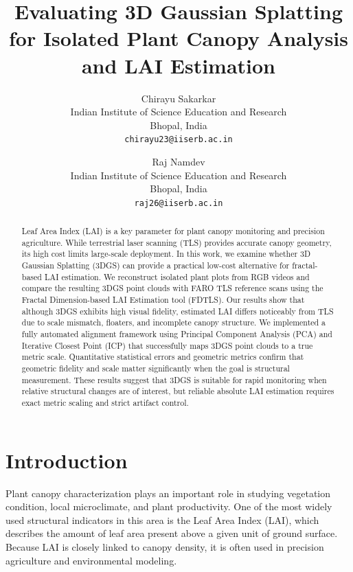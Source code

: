 \documentclass[10pt,twocolumn,letterpaper]{article}
\begin{document}
\title{Evaluating 3D Gaussian Splatting for Isolated Plant Canopy Analysis and LAI Estimation}

\author{Chirayu Sakarkar\\
Indian Institute of Science Education and Research\\
Bhopal, India\\
{\tt\small chirayu23@iiserb.ac.in}
\and
Raj Namdev\\
Indian Institute of Science Education and Research\\
Bhopal, India\\
{\tt\small raj26@iiserb.ac.in}
}

\maketitle

\begin{abstract}
Leaf Area Index (LAI) is a key parameter for plant canopy monitoring and precision agriculture. While terrestrial laser scanning (TLS) provides accurate canopy geometry, its high cost limits large-scale deployment. In this work, we examine whether 3D Gaussian Splatting (3DGS) can provide a practical low-cost alternative for fractal-based LAI estimation. We reconstruct isolated plant plots from RGB videos and compare the resulting 3DGS point clouds with FARO TLS reference scans using the Fractal Dimension-based LAI Estimation tool (FDTLS). Our results show that although 3DGS exhibits high visual fidelity, estimated LAI differs noticeably from TLS due to scale mismatch, floaters, and incomplete canopy structure. We implemented a fully automated alignment framework using Principal Component Analysis (PCA) and Iterative Closest Point (ICP) that successfully maps 3DGS point clouds to a true metric scale. Quantitative statistical errors and geometric metrics confirm that geometric fidelity and scale matter significantly when the goal is structural measurement. These results suggest that 3DGS is suitable for rapid monitoring when relative structural changes are of interest, but reliable absolute LAI estimation requires exact metric scaling and strict artifact control.
\end{abstract}

\section{Introduction}

Plant canopy characterization plays an important role in studying vegetation condition, local microclimate, and plant productivity. One of the most widely used structural indicators in this area is the Leaf Area Index (LAI), which describes the amount of leaf area present above a given unit of ground surface. Because LAI is closely linked to canopy density, it is often used in precision agriculture and environmental modeling.
\end{document}
